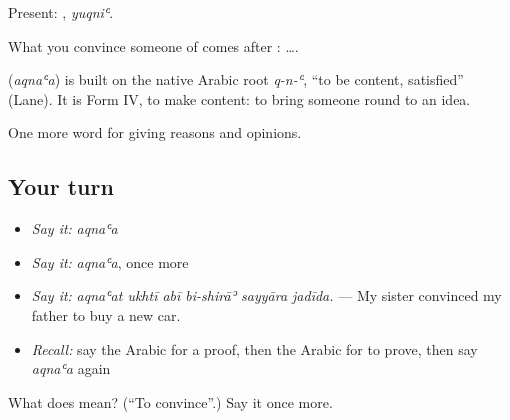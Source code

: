 Present: , \emph{yuqniʿ}.

What you convince someone of comes after :   ….

\begin{cousinweb}
\textbf{} (\emph{aqnaʿa}) is built on the native Arabic root \emph{q-n-ʿ}, \textquotedblleft{}to be content, satisfied\textquotedblright{} (Lane). It is Form IV, to make content: to bring someone round to an idea.
\end{cousinweb}

\begin{grammarlens}[title={What you've built}]
One more word for giving reasons and opinions.
\end{grammarlens}

\subsection*{Your turn}
\begin{itemize}
\raggedright
  \item \emph{Say it:} \emph{aqnaʿa}
  \item \emph{Say it:} \emph{aqnaʿa}, once more
  \item \emph{Say it:} \emph{aqnaʿat ukhtī abī bi-shirāʾ sayyāra jadīda.} — My sister convinced my father to buy a new car.
  \item \emph{Recall:} say the Arabic for a proof, then the Arabic for to prove, then say \emph{aqnaʿa} again
\end{itemize}

\begin{tcolorbox}[breakable,colback=teal!4,colframe=teal!35!black,title={Before you move on}]
What does  mean? (\textquotedblleft{}To convince\textquotedblright{}.) Say it once more.
\end{tcolorbox}
